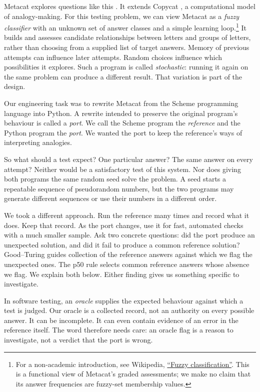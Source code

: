 \documentclass[10pt,letterpaper]{article}
\begin{document}
Metacat explores questions like this \citep{ref21, ref22}. It extends Copycat
\citep{ref23, ref24}, a computational model of analogy-making. For this testing problem,
we can view Metacat as a \emph{fuzzy classifier} with an unknown set of answer classes and
a simple learning loop.\footnote{For a non-academic introduction, see Wikipedia,
  \href{https://en.wikipedia.org/wiki/Fuzzy_classification}{``Fuzzy classification''}.
  This is a functional view of Metacat's graded assessments; we make no claim that its
  answer frequencies are fuzzy-set membership values.} It builds and assesses candidate
relationships between letters and groups of letters, rather than choosing from a supplied
list of target answers. Memory of previous attempts can influence later attempts. Random
choices influence which possibilities it explores. Such a program is called
\emph{stochastic}: running it again on the same problem can produce a different result.
That variation is part of the design.

Our engineering task was to rewrite Metacat from the Scheme programming language into
Python. A rewrite intended to preserve the original program's behaviour is called a
\emph{port}. We call the Scheme program the \emph{reference} and the Python program the
\emph{port}. We wanted the port to keep the reference's ways of interpreting analogies.

So what should a test expect? One particular answer? The same answer on every attempt?
Neither would be a satisfactory test of this system. Nor does giving both programs the
same random seed solve the problem. A seed starts a repeatable sequence of pseudorandom
numbers, but the two programs may generate different sequences or use their numbers in a
different order.

We took a different approach. Run the reference many times and record what it does. Keep
that record. As the port changes, use it for fast, automated checks with a much smaller
sample. Ask two concrete questions: did the port produce an unexpected solution, and did
it fail to produce a common reference solution? Good--Turing guides collection of the
reference answers against which we flag the unexpected ones. The p50 rule selects common
reference answers whose absence we flag. We explain both below. Either finding gives us
something specific to investigate.

In software testing, an \emph{oracle} supplies the expected behaviour against which a test
is judged. Our oracle is a collected record, not an authority on every possible answer. It
can be incomplete. It can even contain evidence of an error in the reference itself. The
word therefore needs care: an oracle flag is a reason to investigate, not a verdict that
the port is wrong.
\end{document}
